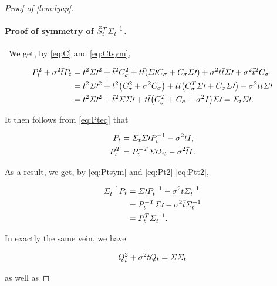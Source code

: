 \begin{proof}[Proof of \cref{lem:lyap}]
\paragraph{Proof of symmetry of $\tilde{S}_{t}^T \Sigma^{-1}_{t}$.}
~We get, by \eqref{eq:C} and \eqref{eq:Ctsym},

\begin{align}
\nn
\Pt^2 + \sdev^2\ctimebar\Pt &= t^2 \Sigma\prime^2 + \ctimebar^2\C^2 + \ctime\ctimebar\parens*{ \Sigma\prime\C + \C\Sigma\prime } + \sdev^2 \ctime\ctimebar \Sigma\prime + \sdev^2\ctimebar^2 \C \\
\nn
&= t^2 \Sigma\prime^2 + \ctimebar^2 \parens*{ \C^2 + \sdev^2\C } + \ctime\ctimebar\parens*{ \C^T \Sigma\prime + \C\Sigma\prime } + \sdev^2 \ctime\ctimebar \Sigma\prime\\
\label{eq:Pteq}
&= t^2 \Sigma\prime^2 + \ctimebar^2 \Sigma\Sigma\prime + \ctime\ctimebar\parens*{ \C^T  + \C + \sdev^2\eye}\Sigma\prime = \Sigcurve\Sigma\prime.
\end{align}

It then follows from \eqref{eq:Pteq} that

\begin{align}
\label{eq:Pt2}
P_{t} &=  \Sigma_{t}\Sigma\prime P_{t}^{-1} - \sigma^2 \bar{t}I, \\
\label{eq:Ptt2}
P_{t}^T  &=  P_{t}^{-T } \Sigma\prime\Sigma_{t} - \sigma^2\bar{t}I.
\end{align}

As a result, we get, by \eqref{eq:Ptsym} and \eqref{eq:Pt2}-\eqref{eq:Ptt2},

\begin{align}
\nonumber
\Sigma^{-1}_{t} P_{t} &= \Sigma\prime P_{t}^{-1} - \sigma^2\bar{t}\Sigma^{-1}_{t} \\
\nonumber
&= P_{t}^{-T }\Sigma\prime - \sigma^2\bar{t}\Sigma^{-1}_{t} \\
\label{eq:PtSig}
&= P_{t}^T \Sigma_{t}^{-1}.
\end{align}

In exactly the same vein, we have

\begin{align}
\label{eq:Qteq}
Q_{t}^2 + \sigma^2 tQ_{t} = \Sigma\Sigma_{t}
\end{align}

as well as


\end{proof}
